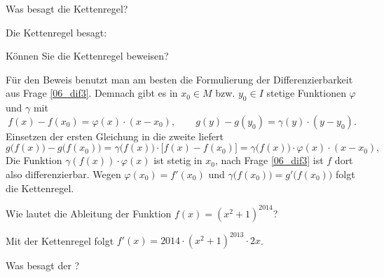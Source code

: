 \begin{frage}
Was besagt die Kettenregel? 
\end{frage}

\begin{antwort}
Die Kettenregel besagt: 

\medskip
\noindent{}
\end{antwort}

\begin{frage}\label{06_kettenregelbeweis}
Können Sie die Kettenregel beweisen?
\end{frage}

\begin{antwort}
 Für den Beweis benutzt man am besten die Formulierung 
der Differenzierbarkeit aus Frage \ref{06_dif3}. 
Demnach gibt es in $x_0\in M$ bzw. $y_0\in I$ stetige Funktionen 
$\varphi$ und $\gamma$ mit 
\[
f(x)-f(x_0) = \varphi(x)\cdot (x-x_0), \qquad
g(y)-g(y_0) = \gamma(y) \cdot (y-y_0).
\]
Einsetzen der ersten Gleichung in die zweite liefert
\[
g\big( f(x) \big)-g \big(f(x_0)\big) = 
\gamma\big( f(x) \big) \cdot \big[ f(x)-f(x_0) \big] 
=\gamma \big( f(x) \big) \cdot \varphi(x) \cdot (x-x_0),
\]
Die Funktion $\gamma\left( f(x) \right)\cdot \varphi(x)$ 
ist stetig in $x_0$, nach Frage \ref{06_dif3}  
ist $f$ dort also differenzierbar. 
Wegen $\varphi(x_0)=f'(x_0)$ und $\gamma\big( f(x_0) \big)= 
g'\big( f(x_0) \big)$ folgt die Kettenregel. \AntEnd
\end{antwort} 

\begin{frage}
Wie lautet die Ableitung der Funktion $f(x)=(x^2+1)^{2014}$?
\end{frage}

\begin{antwort}
Mit der Kettenregel folgt $f'(x)=2014\cdot (x^2+1)^{2013} \cdot 2x$.
\AntEnd 
\end{antwort}

\begin{frage}
Was besagt der ? 
\end{frage}

